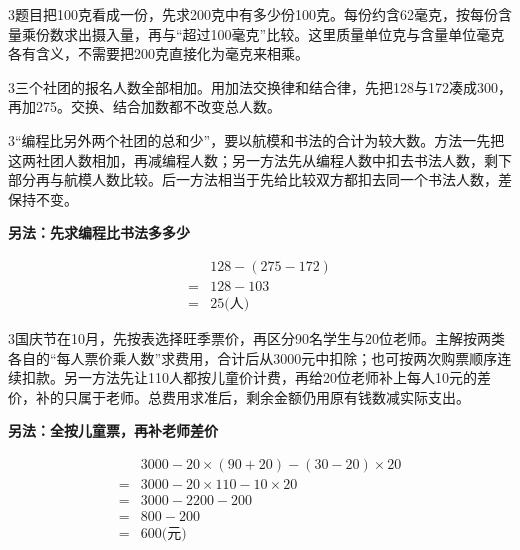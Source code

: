 \documentclass[multi=snippet,border={5bp 20bp 5bp 5bp}]{standalone}
\newenvironment{snippet}[3]{\begin{minipage}{#1bp}\color{answerred}\fontsize{#2}{#3}\selectfont\raggedright}{\end{minipage}}
\begin{document}
\begin{snippet}{505}{11.5}{14}\begin{multicols}{3}\raggedcolumns 题目把100克看成一份，先求200克中有多少份100克。每份约含62毫克，按每份含量乘份数求出摄入量，再与“超过100毫克”比较。这里质量单位克与含量单位毫克各有含义，不需要把200克直接化为毫克来相乘。\end{multicols}\end{snippet}
\begin{snippet}{505}{11.5}{14}\begin{multicols}{3}\raggedcolumns 三个社团的报名人数全部相加。用加法交换律和结合律，先把128与172凑成300，再加275。交换、结合加数都不改变总人数。\end{multicols}\end{snippet}
\begin{snippet}{505}{11.5}{14}\begin{multicols}{3}\raggedcolumns “编程比另外两个社团的总和少”，要以航模和书法的合计为较大数。方法一先把这两社团人数相加，再减编程人数；另一方法先从编程人数中扣去书法人数，剩下部分再与航模人数比较。后一方法相当于先给比较双方都扣去同一个书法人数，差保持不变。\par \textbf{另法：先求编程比书法多多少}\par \[\begin{aligned}&128-(275-172)\\={}&128-103\\={}&25\text{(人)}\end{aligned}\]\end{multicols}\end{snippet}
\begin{snippet}{505}{11.5}{14}\begin{multicols}{3}\raggedcolumns 国庆节在10月，先按表选择旺季票价，再区分90名学生与20位老师。主解按两类各自的“每人票价乘人数”求费用，合计后从3000元中扣除；也可按两次购票顺序连续扣款。另一方法先让110人都按儿童价计费，再给20位老师补上每人10元的差价，补的只属于老师。总费用求准后，剩余金额仍用原有钱数减实际支出。\par \textbf{另法：全按儿童票，再补老师差价}\par \end{multicols}\[\begin{aligned}&3000-20\times(90+20)-(30-20)\times20\\={}&3000-20\times110-10\times20\\={}&3000-2200-200\\={}&800-200\\={}&600\text{(元)}\end{aligned}\]\end{snippet}
\end{document}
